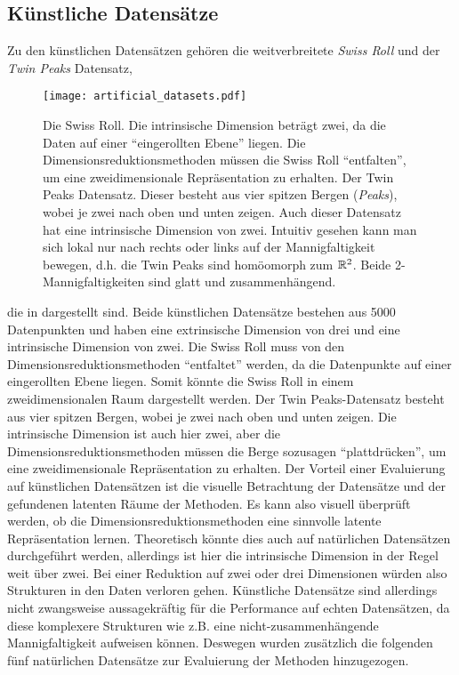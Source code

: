 \subsection{Künstliche Datensätze}
\label{ch:Vergleich:sec:VerwendeteDatensaetze:kuenstlich}
Zu den künstlichen Datensätzen gehören die weitverbreitete \textit{Swiss Roll} und der \textit{Twin Peaks} Datensatz,
\begin{figure}[ht]
	\begin{center}
		\texttt{[image: artificial\_datasets.pdf]}
	\end{center}
	\caption[Künstliche Datensätze]{\figleft Die Swiss Roll. Die intrinsische Dimension beträgt zwei, da die Daten auf einer \enquote{eingerollten Ebene} liegen. Die Dimensionsreduktionsmethoden müssen die Swiss Roll \enquote{entfalten}, um eine zweidimensionale Repräsentation zu erhalten. \figright Der Twin Peaks Datensatz. Dieser besteht aus vier spitzen Bergen (\textit{Peaks}), wobei je zwei nach oben und unten zeigen. Auch dieser Datensatz hat eine intrinsische Dimension von zwei. Intuitiv gesehen kann man sich lokal nur nach rechts oder links auf der Mannigfaltigkeit bewegen, d.h. die Twin Peaks sind homöomorph zum $\mathbb{R}^2$. Beide 2-Mannigfaltigkeiten sind glatt und zusammenhängend.}
	\label{fig:ArtificialDatasets}
\end{figure}
die in  dargestellt sind.
Beide künstlichen Datensätze bestehen aus \num{5000} Datenpunkten und haben eine extrinsische Dimension von drei und eine intrinsische
Dimension von zwei. Die Swiss Roll muss von den Dimensionsreduktionsmethoden \enquote{entfaltet} werden, da die Datenpunkte auf einer eingerollten Ebene liegen. Somit könnte die Swiss Roll in einem zweidimensionalen Raum dargestellt werden. Der Twin Peaks-Datensatz besteht aus vier spitzen Bergen, wobei je zwei nach oben und unten zeigen. Die intrinsische Dimension ist auch hier zwei, aber die Dimensionsreduktionsmethoden müssen die Berge sozusagen \enquote{plattdrücken}, um eine zweidimensionale Repräsentation zu erhalten. Der Vorteil einer Evaluierung auf künstlichen Datensätzen ist die visuelle Betrachtung der Datensätze und der gefundenen
latenten Räume der Methoden. Es kann also visuell überprüft werden, ob die Dimensionsreduktionsmethoden eine sinnvolle latente Repräsentation lernen. Theoretisch könnte dies auch auf natürlichen Datensätzen durchgeführt werden, allerdings ist hier die intrinsische Dimension in der Regel weit über zwei. Bei einer Reduktion auf zwei oder drei Dimensionen würden also Strukturen in den Daten verloren gehen. Künstliche Datensätze sind allerdings nicht zwangsweise aussagekräftig für die Performance auf echten Datensätzen, da diese komplexere Strukturen wie z.B. eine nicht-zusammenhängende Mannigfaltigkeit aufweisen können. Deswegen wurden zusätzlich die folgenden fünf natürlichen Datensätze zur Evaluierung der Methoden hinzugezogen.

